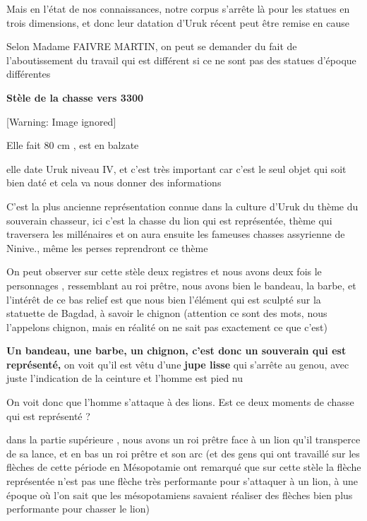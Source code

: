 \documentclass[a4paper,10pt]{article}
\newcommand{\DirImg}{../img/FaivreMartin/}
\begin{document}
Mais en l'état de nos connaissances, notre corpus
s'arrête là pour les statues en trois dimensions,  et
donc leur datation d'Uruk récent peut être remise en
cause 

Selon Madame FAIVRE MARTIN, on peut se demander du fait de
l'aboutissement du travail qui est différent si ce ne
sont pas des statues d'époque différentes

\textbf{Stèle de la chasse vers 3300}

  [Warning: Image ignored] %
 

Elle fait 80 cm , est en balzate

elle date Uruk niveau IV, et c'est très important car
c'est le seul objet qui soit bien daté et cela va nous
donner des informations

C'est la plus ancienne représentation connue dans la
culture d'Uruk du thème du souverain chasseur, ici
c'est la chasse du lion qui est représentée, thème qui
traversera les millénaires et on aura ensuite les fameuses chasses
assyrienne de Ninive., même les perses reprendront ce thème 

On peut observer sur cette stèle deux registres et nous avons deux fois
le personnages , ressemblant au roi prêtre, nous avons bien le bandeau,
la barbe, et l'intérêt de ce bas relief est que nous
bien l'élément qui est sculpté sur la statuette de
Bagdad, à savoir le chignon (attention ce sont des mots, nous
l'appelons chignon, mais en réalité on ne sait pas
exactement ce que c'est)

\textbf{Un bandeau, une barbe, un chignon, c'est donc
un souverain qui est représenté,} on voit qu'il est
vêtu d'une \textbf{jupe lisse} qui
s'arrête au genou, avec juste
l'indication de la ceinture et
l'homme est pied nu

On voit donc que l'homme s'attaque à
des lions. Est ce deux moments de chasse qui est représenté ? 

dans la partie supérieure , nous avons un roi prêtre face à un lion
qu'il transperce de sa lance, et en bas un roi prêtre
et son arc (et des gens qui ont travaillé sur les flèches de cette
période en Mésopotamie ont remarqué que sur cette stèle la flèche
représentée n'est pas une flèche très performante pour
s'attaquer à un lion, à une époque où
l'on sait que les mésopotamiens savaient réaliser des
flèches bien plus performante pour chasser le lion)
\end{document}
